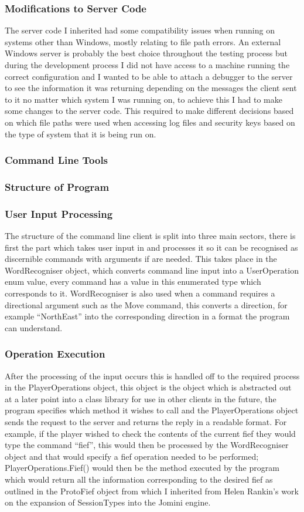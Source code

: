 \documentclass{article}
\begin{document}
\subsubsection{Modifications to Server Code}
The server code I inherited had some compatibility issues when running on systems other than Windows, mostly relating to file path errors. An external Windows server is probably the best choice throughout the testing process but during the development process I did not have access to a machine running the correct configuration and I wanted to be able to attach a debugger to the server to see the information it was returning depending on the messages the client sent to it no matter which system I was running on, to achieve this I had to make some changes to the server code. This required to make different decisions based on which file paths were used when accessing log files and security keys based on the type of system that it is being run on.
\subsubsection{Command Line Tools}
\subsubsection{Structure of Program}
\subsubsection{User Input Processing}
The structure of the command line client is split into three main sectors, there is first the part which takes user input in and processes it so it can be recognised as discernible commands with arguments if are needed. This takes place in the WordRecogniser object, which converts command line input into a UserOperation enum value, every command has a value in this enumerated type which corresponds to it. WordRecogniser is also used when a command requires a directional argument such as the Move command, this converts a direction, for example “NorthEast” into the corresponding direction in a format the program can understand.
\subsubsection{Operation Execution}
After the processing of the input occurs this is handled off to the required process in the PlayerOperations object, this object is the object which is abstracted out at a later point into a class library for use in other clients in the future, the program specifies which method it wishes to call and the PlayerOperations object sends the request to the server and returns the reply in a readable format. For example, if the player wished to check the contents of the current fief they would type the command “fief”, this would then be processed by the WordRecogniser object and that would specify a fief operation needed to be performed; PlayerOperations.Fief() would then be the method executed by the program which would return all the information corresponding to the desired fief as outlined in the ProtoFief object from which I inherited from Helen Rankin’s work on the expansion of SessionTypes into the Jomini engine.
\end{document}
